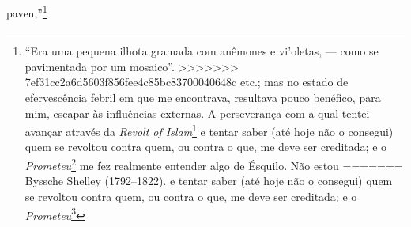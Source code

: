 {{{{{{{{{{{{{{{{{{{{{{{{{{{{{{{{{{{{{{{{{{{{{{{{{{{{{{{{{{{{{{{{{{{{{{{{{{{{{{{{{{{{{{{paven},''\footnote{``Era uma pequena ilhota gramada com anêmones e
  vi'oletas, --- como se pavimentada por um mosaico''. 
>>>>>>> 7ef31cc2a6d5603f856fee4c85bc83700040648c
etc.; mas no estado de efervescência febril em que me encontrava,
resultava pouco benéfico, para mim, escapar às influências externas. A
perseverança com a qual tentei avançar através da \textit{Revolt of
Islam}\footnote{\textit{Revolta do Islã}: título de um poema de Percy
<<<<<<< HEAD
  Byssche Shelley (1792--1822).} e tentar saber (até hoje
não o consegui) quem se revoltou contra quem, ou contra o que, me deve
ser creditada; e o \textit{Prometeu}\footnote{Referência à tragédia
  \textit{Prometeu Acorrentado}, de Ésquilo (c. 525--456 a.C).} me fez realmente entender algo de Ésquilo. Não estou
=======
  Byssche Shelley (1792--1822).  e tentar saber (até hoje
não o consegui) quem se revoltou contra quem, ou contra o que, me deve
ser creditada; e o \textit{Prometeu}\footnote{Referência à tragédia
  \textit{Prometeu Acorrentado}, de Ésquilo (c. 525--456 a.C).
   me fez realmente entender algo de Ésquilo. Não estou
>>>>>>> 7ef31cc2a6d5603f856fee4c85bc83700040648c
certo de que, para aquilo a que me dedicaria, meus dias de efervescência
poderiam ter transcorrido mais tranquilamente; de qualquer modo, foi
melhor do que se tivesse aprendido a atirar, ou a caçar, ou a fumar, ou
a jogar. O que me é totalmente incompreensível, olhando
retrospectivamente, é minha absoluta falta de motivação, de vontade ou
de objetivo naquela questão: eu não tinha nem a determinação de
conquistar Adèle nem a coragem para viver sem ela, nem a inteligência
para considerar o que finalmente resultaria de tudo aquilo, nem a
perspicácia para perceber quão desagradável estava me tornando para
todos aqueles à minha volta. Realmente não havia em mim mais capacidade
ou inteligência do que numa corujinha que acabou de ganhar penas ou num
cachorrinho que acabou de abrir os olhos e descobre, desconsolado, a
existência da lua.

Enquanto estava envolvido em fracas e melodiosas lamúrias dirigidas
àquele astro luminoso, contudo, fui surpreendido por uma carta do Christ
Church a meu pai, avisando"-o de que não haveria alojamento para mim em
janeiro de 1837, e que eu deveria me matricular em outubro no ano em
curso, 1836.

}}}}}}}}}}}}}}}}}}}}}}}}}}}}}}}}}}}}}}}}}}}}}}}}}}}}}}}}}}}}}}}}}}}}}}}}}}}}}}}}}}}}}}}}
